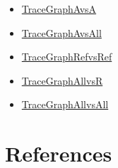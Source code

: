 \documentclass[12pt]{article}
\begin{document}
\begin{itemize}
\item{\hyperref{../../../../traceygraphs/chemcode/avsa.svg}{}{}{TraceGraphAvsA}}
\item{\hyperref{../../../../traceygraphs/chemcode/avsall.svg}{}{}{TraceGraphAvsAll}}
\item{\hyperref{../../../../traceygraphs/chemcode/refvsref.svg}{}{}{TraceGraphRefvsRef}}
\item{\hyperref{../../../../traceygraphs/chemcode/allvsr.svg}{}{}{TraceGraphAllvsR}}
\item{\hyperref{../../../../traceygraphs/chemcode/allvsall.svg}{}{}{TraceGraphAllvsAll}}
\end{itemize}
\section{References}
\label{Sec:References}
\end{document}
